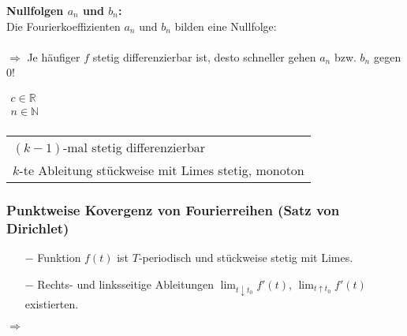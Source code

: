 				\textbf{Nullfolgen $a_n$ und $b_n$:}\\[3pt]
				Die Fourierkoeffizienten $a_n$ und $b_n$ bilden eine Nullfolge:\\[3pt]
				\\[3pt]
				$\Rightarrow$ Je häufiger $f$ stetig differenzierbar ist, desto schneller gehen $a_n$ bzw. $b_n$ gegen $0$!\\[3pt]
				\begin{minipage}[t]{0.5\textwidth}
					$\begin{array}{l}
						c \in \mathbb{R}\\
						n \in \mathbb{N}\\
					\end{array}$
				\end{minipage}
				\begin{minipage}[t]{0.5\textwidth}
					\begin{tabular}{l}
						$(k - 1)$-mal stetig differenzierbar\\
						$k$-te Ableitung stückweise mit Limes stetig, monoton\\
					\end{tabular}
				\end{minipage}
			
			\subsubsection{Punktweise Kovergenz von Fourierreihen (Satz von Dirichlet)}
				\begin{minipage}[b]{0.65\textwidth}
					\begin{itemize}
						\item[$-$] Funktion $f(t)$ ist $T$-periodisch und stückweise stetig mit Limes.
						\item[$-$] Rechts- und linksseitige Ableitungen $\displaystyle \lim_{t \downarrow t_0} f'(t)$, $\displaystyle \lim_{t \uparrow t_0} f'(t)$ existierten.
					\end{itemize}
					$\Rightarrow$ 
				\end{minipage}
				\begin{minipage}[]{0.35\textwidth}
					\scalebox{0.8}{}\\[3pt]
				\end{minipage}
			
